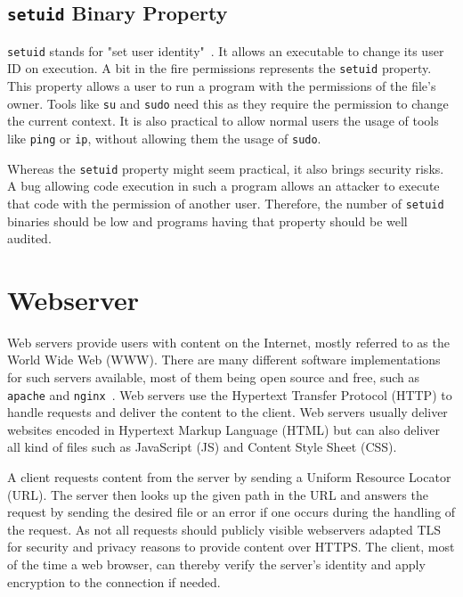 \subsection{\texttt{setuid} Binary Property}

\texttt{setuid} stands for "set user identity"~.
It allows an executable to change its user ID on execution. A bit in the fire
permissions represents the \texttt{setuid} property. This property allows a user
to run a program with the permissions of the file's owner. Tools like
\texttt{su} and \texttt{sudo} need this as they require the permission to change
the current context. It is also practical to allow normal users the usage of
tools like \texttt{ping} or \texttt{ip}, without allowing them the usage of
\texttt{sudo}.

Whereas the \texttt{setuid} property might seem practical, it also brings
security risks. A bug allowing code execution in such a program allows an
attacker to execute that code with the permission of another user. Therefore,
the number of \texttt{setuid} binaries should be low and programs having that
property should be well audited.

\section{Webserver}

Web servers provide users with content on the Internet, mostly referred to as
the World Wide Web (WWW). There are many different software implementations for
such servers available, most of them being open source and free, such as
\texttt{apache} and \texttt{nginx}~. Web
servers use the Hypertext Transfer Protocol (HTTP) to handle requests and
deliver the content to the client. Web servers usually deliver websites encoded
in Hypertext Markup Language (HTML) but can also deliver all kind of files such
as JavaScript (JS) and Content Style Sheet (CSS).

A client requests content from the server by sending a Uniform Resource Locator
(URL). The server then looks up the given path in the URL and answers the
request by sending the desired file or an error if one occurs during the
handling of the request. As not all requests should publicly visible webservers
adapted TLS for security and privacy reasons to provide content over HTTPS. The
client, most of the time a web browser, can thereby verify the server's identity
and apply encryption to the connection if needed.

